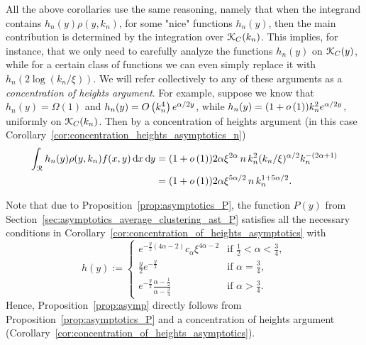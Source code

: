 \begin{remark}\label{rmk:concentration_argument}
All the above corollaries use the same reasoning, namely that when the integrand contains $h_n(y) \rho(y,k_n)$, for some "nice" functions $h_n(y)$, then the main contribution is determined by the integration over ${\mathcal K}_{C}(k_n)$.  This implies, for instance, that we only need to carefully analyze the functions $h_n(y)$ on ${\mathcal K}_{C}(y)$, while for a certain class of functions we can even simply replace it with $h_n(2\log(k_n/\xi))$. We will refer collectively to any of these arguments as a \emph{concentration of heights argument}. For example, suppose we know that $h_n(y) = \Omega(1)$ and $h_n(y) = O\left(k_n^4\right) e^{\alpha/2 y}$, while $h_n(y) = (1 + o\left(1\right)) k_n^2 e^{\alpha/2 y}$, uniformly on ${\mathcal K}_{C}(k_n)$. Then by a concentration of heights argument (in this case Corollary~\ref{cor:concentration_heights_asymptotics_n})
\begin{align*}
	\int_{{\mathcal R}} h_n(y) \rho(y,k_n) f(x,y) \operatorname{\mathrm{d}\hspace{-2pt}} x \operatorname{\mathrm{d}\hspace{-2pt}} y 
	&= (1 + o\left(1\right)) 2 \alpha \xi^{2\alpha} \, n \, k_n^2 (k_n/\xi)^{\alpha/2} k_n^{-(2\alpha + 1)} \\
	&= (1 + o\left(1\right)) 2\alpha \xi^{5\alpha/2} \, n \, k_n^{1 + 5\alpha/2}.
\end{align*}
\end{remark}



\begin{remark}
Note that due to Proposition~\ref{prop:asymptotics_P}, the function $P(y)$ from Section~\ref{sec:asymptotics_average_clustering_ast_P} satisfies all the necessary conditions in Corollary~\ref{cor:concentration_of_heights_asymptotics} with
\[
	h(y) := \begin{cases}
		e^{-\frac{y}{2}(4\alpha - 2)} c_\alpha \xi^{4\alpha - 2} &\mbox{if } \frac{1}{2} < \alpha < \frac{3}{4},\\
		\frac{y}{2} e^{-\frac{y}{2}} &\mbox{if } \alpha = \frac{3}{4},\\
		e^{-\frac{y}{2}} \frac{\alpha - \frac{1}{2}}{\alpha - \frac{3}{4}} &\mbox{if } \alpha > \frac{3}{4}.
	\end{cases}
\] 
Hence, Proposition~\ref{prop:asymp} directly follows from Proposition~\ref{prop:asymptotics_P} and a concentration of heights argument (Corollary~\ref{cor:concentration_of_heights_asymptotics}).
\end{remark}


